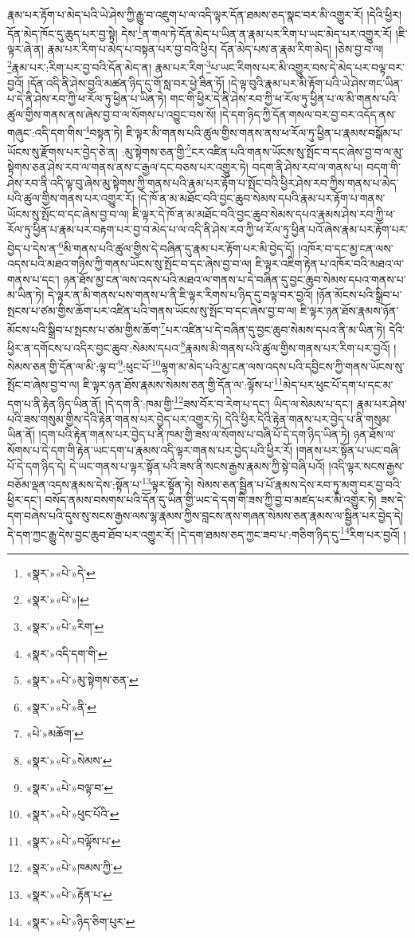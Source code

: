 རྣམ་པར་རྟོག་པ་མེད་པའི་ཡེ་ཤེས་ཀྱི་རྒྱུ་བ་འཇུག་པ་ལ་འདི་ལྟར་དོན་ཐམས་ཅད་སྣང་བར་མི་འགྱུར་རོ། །དེའི་ཕྱིར། དོན་མེད་ཁོང་དུ་ཆུད་པར་བྱ་སྟེ། དེས་\footnote{«སྣར་»«པེ་»དེ་}ན་གལ་ཏེ་དོན་མེད་པ་ཡིན་ན་རྣམ་པར་རིག་པ་ཡང་མེད་པར་འགྱུར་རོ། །ཇི་ལྟར་ཞེ་ན། རྣམ་པར་རིག་པ་མེད་པ་བསྟན་པར་བྱ་བའི་ཕྱིར། དོན་མེད་པས་ན་རྣམ་རིག་མེད། །ཅེས་བྱ་བ་ལ། \footnote{«སྣར་»«པེ་»།  }རྣམ་པར་:རིག་པར་བྱ་བའི་དོན་མེད་ན། རྣམ་པར་རིག་\footnote{«སྣར་»«པེ་»རིག་}པ་ཡང་རིགས་པར་མི་འགྱུར་བས་དེ་མེད་པར་བལྟ་བར་བྱའོ། །དོན་འདི་ནི་ཤེས་བྱའི་མཚན་ཉིད་དུ་གོ་སླ་བར་ཕྱེ་ཟིན་ཏོ། །དེ་ལྟ་བུའི་རྣམ་པར་མི་རྟོག་པའི་ཡེ་ཤེས་གང་ཡིན་པ་དེ་ནི་ཤེས་རབ་ཀྱི་ཕ་རོལ་ཏུ་ཕྱིན་པ་ཡིན་ཏེ། གང་གི་ཕྱིར་དེ་ནི་ཤེས་རབ་ཀྱི་ཕ་རོལ་ཏུ་ཕྱིན་པ་ལ་མི་གནས་པའི་ཚུལ་གྱིས་གནས་ནས་ཞེས་བྱ་བ་ལ་སོགས་པ་འབྱུང་བས་སོ། །དེ་དག་ཉིད་ཀྱི་དོན་གསལ་བར་བྱ་བར་འདོད་ནས་གཞུང་:འདི་དག་གིས་\footnote{«སྣར་»འདི་དག་གི་}བསྟན་ཏེ། ཇི་ལྟར་མི་གནས་པའི་ཚུལ་གྱིས་གནས་ནས་ཕ་རོལ་ཏུ་ཕྱིན་པ་རྣམས་བསྒོམ་པ་ཡོངས་སུ་རྫོགས་པར་བྱེད་ཅེ་ན། :མུ་སྟེགས་ཅན་གྱི་\footnote{«སྣར་»«པེ་»མུ་སྟེགས་ཅན་}ངར་འཛིན་པའི་གནས་ཡོངས་སུ་སྤོང་བ་དང་ཞེས་བྱ་བ་ལ་མུ་སྟེགས་ཅན་ཤེས་རབ་ལ་གནས་ནས་ང་རྒྱལ་དང་བཅས་པར་འགྱུར་ཏེ། བདག་ནི་ཤེས་རབ་ལ་གནས་པ། བདག་གི་ཤེས་རབ་ནི་འདི་ལྟ་བུ་ཞེས་མུ་སྟེགས་ཀྱི་གནས་པའི་རྣམ་པར་རྟོག་པ་སྤོང་བའི་ཕྱིར་ཤེས་རབ་ཀྱིས་གནས་པ་མེད་པའི་ཚུལ་གྱིས་གནས་པར་འགྱུར་རོ། །དེ་ཁོ་ན་མ་མཐོང་བའི་བྱང་ཆུབ་སེམས་དཔའི་རྣམ་པར་རྟོག་པ་གནས་ཡོངས་སུ་སྤོང་བ་དང་ཞེས་བྱ་བ་ལ། ཇི་ལྟར་དེ་ཁོ་ན་མ་མཐོང་བའི་བྱང་ཆུབ་སེམས་དཔའ་རྣམས་ཤེས་རབ་ཀྱི་ཕ་རོལ་ཏུ་ཕྱིན་པ་རྣམ་པར་བརྟག་པར་བྱ་བ་མེད་པ་ལ་འདི་ནི་ཤེས་རབ་ཀྱི་ཕ་རོལ་ཏུ་ཕྱིན་པའོ་ཞེས་རྣམ་པར་རྟོག་པར་བྱེད་པ་དེས་ན་\footnote{«སྣར་»«པེ་»ནི་}མི་གནས་པའི་ཚུལ་གྱིས་དེ་བཞིན་དུ་རྣམ་པར་རྟོག་པར་མི་བྱེད་དོ། །འཁོར་བ་དང་མྱ་ངན་ལས་འདས་པའི་མཐའ་གཉིས་ཀྱི་གནས་ཡོངས་སུ་སྤོང་བ་དང་ཞེས་བྱ་བ་ལ། ཇི་ལྟར་འཇིག་རྟེན་པ་འཁོར་བའི་མཐའ་ལ་གནས་པ་དང་། ཉན་ཐོས་མྱ་ངན་ལས་འདས་པའི་མཐའ་ལ་གནས་པ་དེ་བཞིན་དུ་བྱང་ཆུབ་སེམས་དཔའ་གནས་པ་མ་ཡིན་ཏེ། དེ་ལྟར་ན་མི་གནས་པས་གནས་པ་ནི་ཇི་ལྟར་རིགས་པ་ཉིད་དུ་བལྟ་བར་བྱའོ། །ཉོན་མོངས་པའི་སྒྲིབ་པ་སྤངས་པ་ཙམ་གྱིས་ཆོག་པར་འཛིན་པའི་གནས་ཡོངས་སུ་སྤོང་བ་དང་ཞེས་བྱ་བ་ལ། ཇི་ལྟར་ཉན་ཐོས་རྣམས་ཉོན་མོངས་པའི་སྒྲིབ་པ་སྤངས་པ་ཙམ་གྱིས་ཆོག་\footnote{«པེ་»མཆོག་}པར་འཛིན་པ་དེ་བཞིན་དུ་བྱང་ཆུབ་སེམས་དཔའ་ནི་མ་ཡིན་ཏེ། དེའི་ཕྱིར་ན་དགོངས་པ་འདིར་བྱང་ཆུབ་:སེམས་དཔའ་\footnote{«སྣར་»«པེ་»སེམས་}རྣམས་མི་གནས་པའི་ཚུལ་གྱིས་གནས་པར་རིག་པར་བྱའོ། །སེམས་ཅན་གྱི་དོན་ལ་མི་:ལྟ་བ་\footnote{«སྣར་»«པེ་»བལྟ་བ་}:ཕུང་པོ་\footnote{«སྣར་»«པེ་»ཕུང་པོའི་}ལྷག་མ་མེད་པའི་མྱ་ངན་ལས་འདས་པའི་དབྱིངས་ཀྱི་གནས་ཡོངས་སུ་སྤོང་བ་ཞེས་བྱ་བ་ལ། ཇི་ལྟར་ཉན་ཐོས་རྣམས་སེམས་ཅན་གྱི་དོན་ལ་:ལྟོས་པ་\footnote{«སྣར་»«པེ་»བལྟོས་པ་}མེད་པར་ཕུང་པོ་དག་པ་དང་མ་དག་པ་ནི་རྟེན་ཉིད་ཡིན་ནོ། །དེ་དག་ནི་:ཁམ་གྱི་\footnote{«སྣར་»«པེ་»ཁམས་ཀྱི་}ཟས་བོར་བ་རེག་པ་དང་། ཡིད་ལ་སེམས་པ་དང་། རྣམ་པར་ཤེས་པའི་ཟས་གསུམ་གྱིས་དེའི་རྟེན་གནས་པར་བྱེད་པར་འགྱུར་ཏེ། དེའི་ཕྱིར་དེའི་རྟེན་གནས་པར་བྱེད་པ་ནི་གསུམ་ཡིན་ནོ། །དག་པའི་རྟེན་གནས་པར་བྱེད་པ་ནི་ཁམ་གྱི་ཟས་ལ་སོགས་པ་བཞི་པོ་དེ་དག་ཉིད་ཡིན་ཏེ། ཉན་ཐོས་ལ་སོགས་པ་དེ་དག་གི་རྟེན་ཡང་དག་པ་རྣམས་འདི་ལྟར་གནས་པར་བྱེད་པའི་ཕྱིར་རོ། །གནས་པར་སྟོན་པ་ཡང་བཞི་པོ་དེ་དག་ཉིད་དེ། དེ་ཡང་གནས་པ་ལྟར་སྟོན་པའི་ཟས་ནི་སངས་རྒྱས་རྣམས་ཀྱི་སྟེ་བཞི་པའོ། །འདི་ལྟར་སངས་རྒྱས་བཅོམ་ལྡན་འདས་རྣམས་དེས་:སྟོན་པ་\footnote{«སྣར་»«པེ་»རྟོན་པ་}ལྟར་སྟོན་ཏེ། སེམས་ཅན་སྦྱིན་པ་པོ་རྣམས་དེས་རབ་ཏུ་མགུ་བར་བྱ་བའི་ཕྱིར་དང་། བསོད་ནམས་བསགས་པའི་དོན་དུ་ཡིན་གྱི་ཡང་དེ་དག་གི་ཟས་ཀྱི་བྱ་བ་མཛད་པར་མི་འགྱུར་ཏེ། ཟས་དེ་དག་བཞེས་པའི་དུས་སུ་སངས་རྒྱས་ལས་ལྷ་རྣམས་ཀྱིས་བླངས་ནས་གཞན་སེམས་ཅན་རྣམས་ལ་སྦྱིན་པར་བྱེད་དེ། དེ་དག་ཀྱང་རྒྱུ་དེས་བྱང་ཆུབ་ཐོབ་པར་འགྱུར་རོ། །དེ་དག་ཐམས་ཅད་ཀྱང་ཟབ་པ་:གཅིག་ཉིད་དུ་\footnote{«སྣར་»«པེ་»ཉིད་ཅིག་པུར་}རིག་པར་བྱའོ། །

